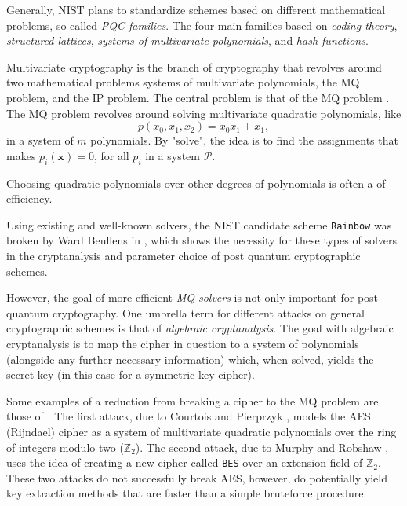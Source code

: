Generally, NIST plans to standardize schemes based on different mathematical problems, so-called \textit{PQC families}. The four main families based on \textit{coding theory}, \textit{structured lattices}, \textit{systems of multivariate polynomials}, and \textit{hash functions}.

Multivariate cryptography is the branch of cryptography that revolves around two mathematical problems systems of multivariate polynomials, the MQ problem, and the IP problem. The central problem is that of the MQ problem \cite{ding2020}. The MQ problem revolves around solving multivariate quadratic polynomials, like 
$$
    p(x_0,x_1,x_2) = x_0x_1 + x_1,
$$
in a system of $m$ polynomials. By "solve", the idea is to find the assignments that makes $p_i(\mathbf{x}) = 0$, for all $p_i$ in a system $\mathcal{P}$.



Choosing quadratic polynomials over other degrees of polynomials is often a  of efficiency.


 Using existing and well-known solvers, the NIST candidate scheme \texttt{Rainbow} was broken by Ward Beullens in \cite{crypto-2022-32130}, which shows the necessity for these types of solvers in the cryptanalysis and parameter choice of post quantum cryptographic schemes.

However, the goal of more efficient \textit{MQ-solvers} is not only important for post-quantum cryptography. One umbrella term for different attacks on general cryptographic schemes is that of \textit{algebraic cryptanalysis}. The goal with algebraic cryptanalysis is to map the cipher in question to a system of polynomials (alongside any further necessary information) which, when solved, yields the secret key (in this case for a symmetric key cipher).

Some examples of a reduction from breaking a cipher to the MQ problem are those of \cite{nover2005algebraic}. The first attack, due to Courtois and Pierprzyk \cite{courtois2002cryptanalysis}, models the AES (Rijndael) cipher as a system of multivariate quadratic polynomials over the ring of integers modulo two ($\mathbb{Z}_2$). The second attack, due to Murphy and Robshaw \cite{crypto-2002-1565}, uses the idea of creating a new cipher called \texttt{BES} over an extension field of $\mathbb{Z}_2$. These two attacks do not successfully break AES, however, do potentially yield key extraction methods that are faster than a simple bruteforce procedure.

